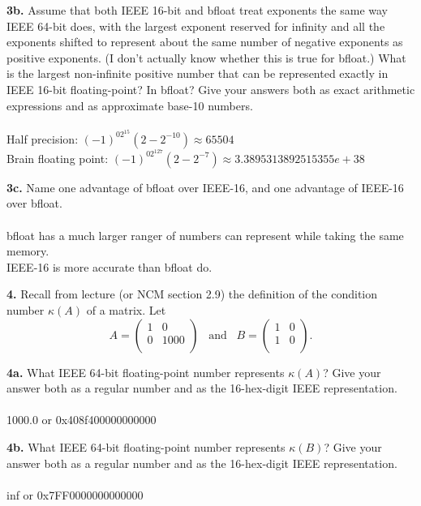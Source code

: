 \documentclass[11pt]{article}
\begin{document}
\par\medskip
{\bf 3b.}
Assume that both IEEE 16-bit and bfloat treat exponents the same way IEEE 64-bit
does, with the largest exponent reserved for infinity and all the exponents
shifted to represent about the same number of negative exponents as positive
exponents. (I don't actually know whether this is true for bfloat.)
What is the largest non-infinite positive number that can be represented exactly
in IEEE 16-bit floating-point? In bfloat? Give your answers both as exact
arithmetic expressions and as approximate base-10 numbers.\\\\
Half precision: $(-1)^02^{15}(2-2^{-10})\approx 65504$
\\Brain floating point: $(-1)^02^{127}(2-2^{-7})\approx 3.3895313892515355e+38$
\par\medskip
{\bf 3c.}
Name one advantage of bfloat over IEEE-16, 
and one advantage of IEEE-16 over bfloat.\\\\
bfloat has a much larger ranger of numbers can represent while taking the same memory. \\
IEEE-16 is more accurate than bfloat do.
\newpage

\par\bigskip
{\bf 4.}
Recall from lecture (or NCM section 2.9) the definition of
the condition number $\kappa(A)$ of a matrix. Let
$$
   A =
   \left(
   \begin{array}{cc}
    1 & 0 \\ 	
    0 & 1000 \\ 
   \end{array} \right)
   \hspace{10pt}
   \mbox{and}
   \hspace{10pt}
   B =
   \left(
   \begin{array}{cc}
    1 & 0 \\ 	
    1 & 0 \\ 
   \end{array} \right).
$$

{\bf 4a.}
What IEEE 64-bit floating-point number represents $\kappa(A)$?
Give your answer both as a regular number and as the 
16-hex-digit IEEE representation.\\\\
1000.0 or 0x408f400000000000

\par\medskip
{\bf 4b.}
What IEEE 64-bit floating-point number represents $\kappa(B)$?
Give your answer both as a regular number and as the 
16-hex-digit IEEE representation.\\\\
inf or 0x7FF0000000000000
\newpage
\end{document}

